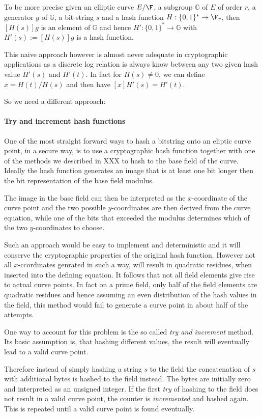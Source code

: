 To be more precise given an elliptic curve $E/\F$, a subgroup $\mathbb{G}$ of $E$ of order $r$, a generator $g$ of $\mathbb{G}$, a bit-string $s$ and a hash function $H: \{0,1\}^* \to \F_{r}$, then $[H(s)]g$ is an element of $\mathbb{G}$ and hence $H':  \{0,1\}^* \to \mathbb{G}$ with $H'(s):= [H(s)]g$ is a hash function. 

This naive approach however is almost never adequate in cryptographic applications as a discrete log relation is always know between any two given hash value $H'(s)$ and $H'(t)$. In fact for $H(s)\neq 0$, we can define $x= H(t)/H(s)$ and then have $[x]H'(s)=H'(t)$.

So we need a different approach:
\paragraph{Try and increment hash functions}
One of the most straight forward ways to hash a bitstring onto an eliptic curve point, in a  secure way, is to use a cryptographic hash function together with one of the methods we described in XXX to hash to the base field of the curve. Ideally the hash function generates an image that is at least one bit longer then the bit representation of the base field modulus.

The image in the base field can then be interpreted as the $x$-coordinate of the curve point and the two possible $y$-coordinates are then derived from the curve equation, while one of the bits that exceeded the modulus determines which of the two $y$-coordinates to choose.

Such an approach would be easy to implement and deterministic and it will conserve the cryptographic properties of the original hash function. However not all $x$-ccordinates genrated in such a way, will result in quadratic residues, when inserted into the defining equation. It follows that not all field elements give rise to actual curve points. In fact
on a prime field, only half of the field elements are quadratic residues and hence assuming an even distribution of the hash values in the field, this method would fail to generate a curve point in about half of the attempts. 

One way to account for this problem is the so called \textit{try and increment} method. Its basic assumption is, that hashing different values, the result will eventually lead to a valid curve point. 

Therefore instead of simply hashing a string $s$ to the field the concatenation of $s$ with additional bytes is hashed to the field instead. The bytes are initially zero and interpreted as an unsigned integer. If the first \textit{try} of hashing to the field does not result in a valid curve point, the counter is \textit{incremented} and hashed again. This is repeated until a valid curve point is found eventually.

